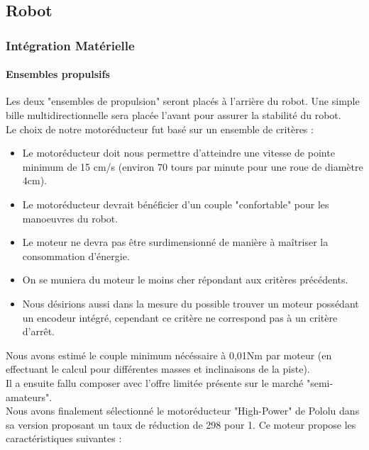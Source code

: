 \subsection{Robot}

	\subsubsection{Intégration Matérielle}

		\paragraph{Ensembles propulsifs}

			Les deux "ensembles de propulsion" seront placés à l'arrière du robot. Une simple bille multidirectionnelle sera placée l'avant pour assurer la stabilité du robot.\\

			Le choix de notre motoréducteur fut basé sur un ensemble de critères :
			\begin{itemize}
				\item Le motoréducteur doit nous permettre d’atteindre une vitesse de pointe minimum de 15 cm/s (environ 70 tours par minute pour une roue de diamètre 4cm).
				\item Le motoréducteur devrait bénéficier d'un couple "confortable" pour les manoeuvres du robot.
				\item Le moteur ne devra pas être surdimensionné de manière à maîtriser la consommation d’énergie.
				\item On se muniera du moteur le moins cher répondant aux critères précédents.
				\item Nous désirions aussi dans la mesure du possible trouver un moteur possédant un encodeur intégré, cependant ce critère ne correspond pas à un critère d’arrêt.
			\end{itemize}

			Nous avons estimé le couple minimum nécéssaire à 0,01Nm par moteur (en effectuant le calcul pour différentes masses et inclinaisons de la piste).\\

			Il a ensuite fallu composer avec l'offre limitée présente sur le marché "semi-amateurs".\\

			Nous avons finalement sélectionné le motoréducteur "High-Power" de Pololu dans sa version proposant un taux de réduction de 298 pour 1.
			Ce moteur propose les caractéristiques suivantes :\cite{bib8} \\

